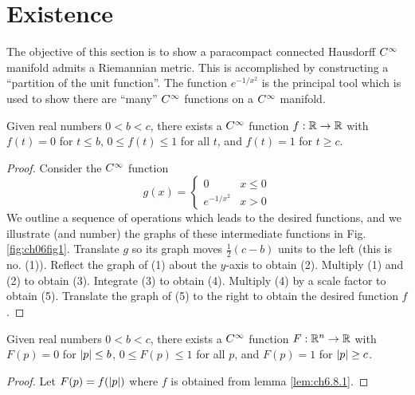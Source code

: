 \documentclass[../main]{subfiles}
\begin{document}
\section{Existence}\label{ch06:s8}

The objective of this section is to show a paracompact connected Hausdorff $C^\infty$ manifold admits a Riemannian metric. This is accomplished by constructing a ``partition of the unit function''. The function $e^{-1/x^2}$ is the principal tool which is used to show there are ``many'' $C^\infty$ functions on a $C^\infty$ manifold.


\begin{lemma} \label{lem:ch6.8.1}
Given real numbers $0<b<c$, there exists a $C^\infty$ function $f:\mathbb{R}\to\mathbb{R}$ with $f(t)=0$ for $t\le b$, $0\le f(t)\le 1$ for all $t$, and $f(t)=1$ for $t\ge c$.
\end{lemma}

\begin{proof}
Consider the $C^\infty$ function
\[g(x) =
\begin{cases}
    0 & x\le 0 \\
    e^{-1/x^2} & x>0
\end{cases}
\]
We outline a sequence of operations which leads to the desired functions, and we illustrate (and number) the graphs of these intermediate functions in Fig. \ref{fig:ch06fig1}. Translate $g$ so its graph moves $\frac12(c-b)$ units to the left (this is no. (1)). Reflect the graph of (1) about the $y$-axis to obtain (2). Multiply (1) and (2) to obtain (3). Integrate (3) to obtain (4). Multiply (4) by a scale factor to obtain (5). Translate the graph of (5) to the right to obtain the desired function $f$.
\end{proof}







\begin{lemma} \label{lem:ch6.8.2}
Given real numbers $0<b<c$, there exists a $C^\infty$ function \newline $F:\mathbb{R}^n\to\mathbb{R}$ with $F(p)=0$ for $\left|p\right|\le b$, $0\le F(p)\le 1$ for all $p$, and $F(p)=1$ for $\left|p\right|\ge c$.
\end{lemma}

\begin{proof}
Let $F(p)=f(\left|p\right|)$ where $f$ is obtained from lemma \ref{lem:ch6.8.1}.
\end{proof}
\end{document}

